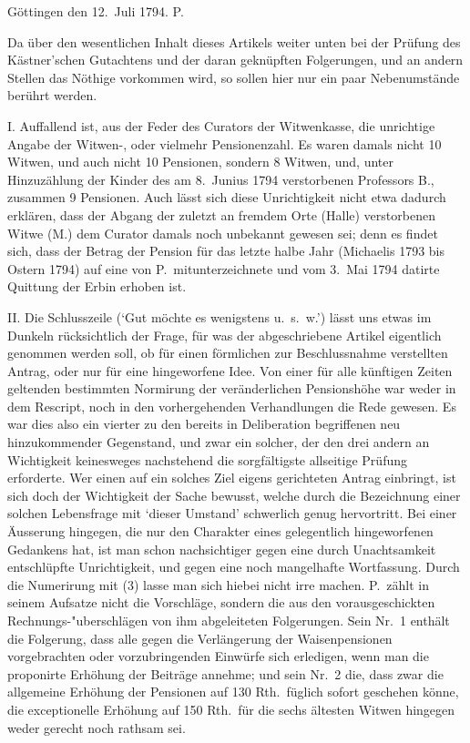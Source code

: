 \documentclass[12pt,a4paper]{article}
\begin{document}
\begin{flushright}
G\"ottingen den 12.\ Juli 1794. \hspace{2em} P.
\end{flushright}

Da \"uber den wesentlichen Inhalt dieses Artikels weiter unten bei der Pr\"ufung des K\"astner'schen Gutachtens und der daran gekn\"upften Folgerungen, und an andern Stellen das N\"othige vorkommen wird, so sollen hier nur ein paar Nebenumst\"ande ber\"uhrt werden.

I. Auffallend ist, aus der Feder des Curators der Witwenkasse, die unrichtige Angabe der Witwen-, oder vielmehr Pensionenzahl. Es waren damals nicht 10 Witwen, und auch nicht 10 Pensionen, sondern 8 Witwen, und, unter Hinzuz\"ahlung der Kinder des am 8.\ Junius 1794 verstorbenen Professors B., zusammen 9 Pensionen. Auch l\"asst sich diese Unrichtigkeit nicht etwa dadurch erkl\"aren, dass der Abgang der zuletzt an fremdem Orte (Halle) verstorbenen Witwe (M.) dem Curator damals noch unbekannt gewesen sei; denn es findet sich, dass der Betrag der Pension f\"ur das letzte halbe Jahr (Michaelis 1793 bis Ostern 1794) auf eine von P.\ mitunterzeichnete und vom 3.\ Mai 1794 datirte Quittung der Erbin erhoben ist.

II. Die Schlusszeile (`Gut m\"ochte es wenigstens u.\ s.\ w.') l\"asst uns etwas im Dunkeln r\"ucksichtlich der Frage, f\"ur was der abgeschriebene Artikel eigentlich genommen werden soll, ob f\"ur einen f\"ormlichen zur Beschlussnahme verstellten Antrag, oder nur f\"ur eine hingeworfene Idee. Von einer f\"ur alle k\"unftigen Zeiten geltenden bestimmten Normirung der ver\"anderlichen Pensionsh\"ohe war weder in dem Rescript, noch in den vorhergehenden Verhandlungen die Rede gewesen. Es war dies also ein vierter zu den bereits in Deliberation begriffenen neu hinzukommender Gegenstand, und zwar ein solcher, der den drei andern an Wichtigkeit keinesweges nachstehend die sorgf\"altigste allseitige Pr\"ufung erforderte. Wer einen auf ein solches Ziel eigens gerichteten Antrag einbringt, ist sich doch der Wichtigkeit der Sache bewusst, welche durch die Bezeichnung einer solchen Lebensfrage mit `dieser Umstand' schwerlich genug hervortritt. Bei einer \"Ausserung hingegen, die nur den Charakter eines gelegentlich hingeworfenen Gedankens hat, ist man schon nachsichtiger gegen eine durch Unachtsamkeit entschl\"upfte Unrichtigkeit, und gegen eine noch mangelhafte Wortfassung. Durch die Numerirung mit (3) lasse man sich hiebei nicht irre machen. P.\ z\"ahlt in seinem Aufsatze nicht die Vorschl\"age, sondern die aus den vorausgeschickten Rechnungs-"uberschl\"agen von ihm abgeleiteten Folgerungen. Sein Nr.\ 1 enth\"alt die Folgerung, dass alle gegen die Verl\"angerung der Waisenpensionen vorgebrachten oder vorzubringenden Einw\"urfe sich erledigen, wenn man die proponirte Erh\"ohung der Beitr\"age annehme; und sein Nr.\ 2 die, dass zwar die allgemeine Erh\"ohung der Pensionen auf 130 Rth.\ f\"uglich sofort geschehen k\"onne, die exceptionelle Erh\"ohung auf 150 Rth.\ f\"ur die sechs \"altesten Witwen hingegen weder gerecht noch rathsam sei.
\end{document}
